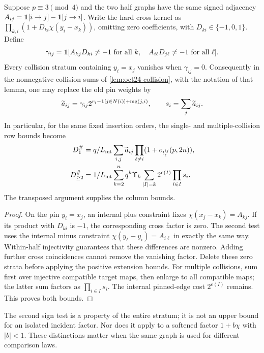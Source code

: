 \begin{lemma}\label{lem:signed-collisions}
Suppose $p\equiv3\pmod4$ and the two half graphs have the same signed
adjacency $A_{ij}=\one[i\to j]-\one[j\to i]$. Write the hard cross
kernel as $\prod_{k,i}(1+D_{ki}\chi(y_i-x_k))$, omitting zero
coefficients, with $D_{ki}\in\{-1,0,1\}$. Define
\[
 \gamma_{ij}=\one[A_{kj}D_{ki}\ne-1\text{ for all }k,\quad
                       A_{i\ell}D_{j\ell}\ne-1\text{ for all }\ell].
\]
Every collision stratum containing $y_i=x_j$ vanishes when
$\gamma_{ij}=0$. Consequently in the nonnegative collision sums of
\cref{lem:oct24-collision}, with the notation of that lemma, one may replace the old pin weights by
\[
 \widetilde a_{ij}=\gamma_{ij}
       2^{r_i-\one[j\in N(i)]+\mathrm{mg}(j,i)},\qquad
 s_i=\sum_j\widetilde a_{ij}.
\]
In particular, for the same fixed insertion orders, the single- and
multiple-collision row bounds become
\begin{align*}
 D_1^\#&=\frac q{L_{\rm int}}\sum_{i,j}\widetilde a_{ij}
                      \prod_{\ell\ne i}(1+e_{t^{ij}_\ell}(p,2n)),\\
 D_{\ge2}^\#&=\frac1{L_{\rm int}}\sum_{k=2}^n q^k\Upsilon_k
                  \sum_{|I|=k}2^{e(I)}\prod_{i\in I}s_i.
\end{align*}
The transposed argument supplies the column bounds.
\end{lemma}
\begin{proof}
On the pin $y_i=x_j$, an internal plus constraint fixes
$\chi(x_j-x_k)=A_{kj}$. If its product with $D_{ki}$ is $-1$,
the corresponding cross factor is zero. The second test uses the
internal minus constraint
$\chi(y_\ell-y_i)=A_{i\ell}$ in exactly the same way.
Within-half injectivity guarantees that these differences are nonzero.
Adding further cross coincidences cannot remove the vanishing factor.
Delete these zero strata before applying the positive extension bounds.
For multiple collisions, sum first over injective compatible target
maps, then enlarge to all compatible maps; the latter sum factors
as $\prod_{i\in I}s_i$. The internal pinned-edge cost $2^{e(I)}$
remains. This proves both bounds.
\end{proof}

The second sign test is a property of the entire stratum; it is not
an upper bound for an isolated incident factor. Nor does it apply to
a softened factor $1+b\chi$ with $|b|<1$. These distinctions matter
when the same graph is used for different comparison laws.

